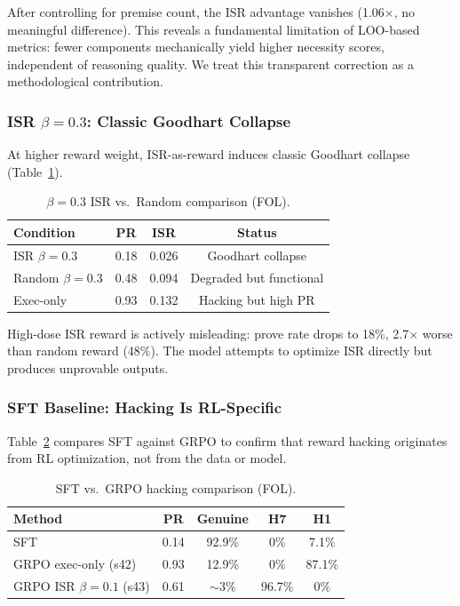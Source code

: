 \documentclass[11pt,a4paper]{article}
\newcommand{\isr}{\textsc{ISR}}
\begin{document}
After controlling for premise count, the ISR advantage vanishes (1.06$\times$, no meaningful difference).
This reveals a fundamental limitation of LOO-based metrics: fewer components mechanically yield higher necessity scores, independent of reasoning quality.
We treat this transparent correction as a methodological contribution.

\subsubsection{ISR $\beta{=}0.3$: Classic Goodhart Collapse}

At higher reward weight, ISR-as-reward induces classic Goodhart collapse (Table~\ref{tab:beta03}).

\begin{table}[h]
\centering
\caption{$\beta{=}0.3$ ISR vs.\ Random comparison (FOL).}
\label{tab:beta03}
\begin{tabular}{lccc}
\toprule
Condition & PR & ISR & Status \\
\midrule
ISR $\beta{=}0.3$ & 0.18 & 0.026 & Goodhart collapse \\
Random $\beta{=}0.3$ & 0.48 & 0.094 & Degraded but functional \\
Exec-only & 0.93 & 0.132 & Hacking but high PR \\
\bottomrule
\end{tabular}
\end{table}

High-dose ISR reward is actively misleading: prove rate drops to 18\%, 2.7$\times$ worse than random reward (48\%).
The model attempts to optimize \isr{} directly but produces unprovable outputs.

\subsubsection{SFT Baseline: Hacking Is RL-Specific}

Table~\ref{tab:sft} compares SFT against GRPO to confirm that reward hacking originates from RL optimization, not from the data or model.

\begin{table}[h]
\centering
\caption{SFT vs.\ GRPO hacking comparison (FOL).}
\label{tab:sft}
\begin{tabular}{lcccc}
\toprule
Method & PR & Genuine & H7 & H1 \\
\midrule
SFT & 0.14 & 92.9\% & 0\% & 7.1\% \\
GRPO exec-only (s42) & 0.93 & 12.9\% & 0\% & 87.1\% \\
GRPO ISR $\beta{=}0.1$ (s43) & 0.61 & ${\sim}3\%$ & 96.7\% & 0\% \\
\bottomrule
\end{tabular}
\end{table}
\end{document}
